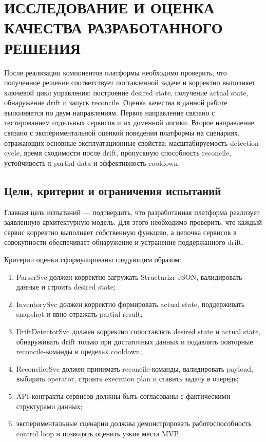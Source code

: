 \section{ИССЛЕДОВАНИЕ И ОЦЕНКА КАЧЕСТВА РАЗРАБОТАННОГО РЕШЕНИЯ}

После реализации компонентов платформы необходимо проверить, что полученное решение соответствует поставленной задаче и корректно выполняет ключевой цикл управления: построение desired state, получение actual state, обнаружение drift и запуск reconcile. Оценка качества в данной работе выполняется по двум направлениям. Первое направление связано с тестированием отдельных сервисов и их доменной логики. Второе направление связано с экспериментальной оценкой поведения платформы на сценариях, отражающих основные эксплуатационные свойства: масштабируемость detection cycle, время сходимости после drift, пропускную способность reconcile, устойчивость к partial data и эффективность cooldown.

\subsection{Цели, критерии и ограничения испытаний}

Главная цель испытаний --- подтвердить, что разработанная платформа реализует заявленную архитектурную модель. Для этого необходимо проверить, что каждый сервис корректно выполняет собственную функцию, а цепочка сервисов в совокупности обеспечивает обнаружение и устранение поддержанного drift.

Критерии оценки сформулированы следующим образом:
\begin{enumerate}
    \item ParserSvc должен корректно загружать Structurizr JSON, валидировать данные и строить desired state;
    \item InventorySvc должен корректно формировать actual state, поддерживать snapshot и явно отражать partial result;
    \item DriftDetectorSvc должен корректно сопоставлять desired state и actual state, обнаруживать drift только при достаточных данных и подавлять повторные reconcile-команды в пределах cooldown;
    \item ReconcilerSvc должен принимать reconcile-команды, валидировать payload, выбирать operator, строить execution plan и ставить задачу в очередь;
    \item API-контракты сервисов должны быть согласованы с фактическими структурами данных;
    \item экспериментальные сценарии должны демонстрировать работоспособность control loop и позволять оценить узкие места MVP.
\end{enumerate}

